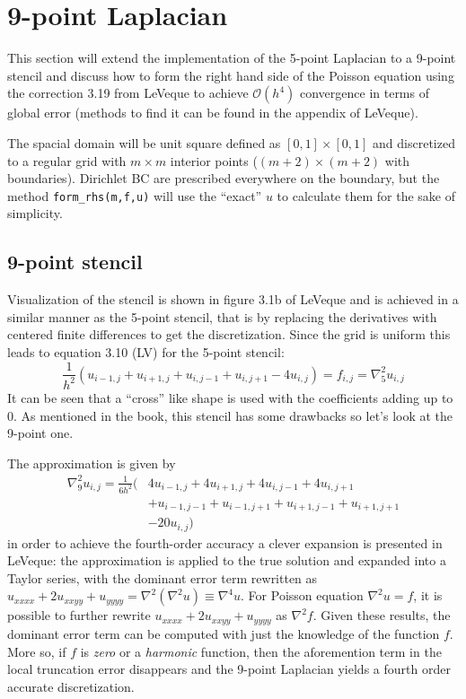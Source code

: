\documentclass[main.tex]{subfiles}
\begin{document}
\section{9-point Laplacian}
This section will extend the implementation of the 5-point Laplacian to a 9-point stencil and discuss how to form the right hand side of the Poisson equation using the correction 3.19 from LeVeque to achieve $\mathcal{O}(h^4)$ convergence in terms of global error (methods to find it can be found in the appendix of LeVeque).

The spacial domain will be unit square defined as $[0,1] \times [0,1]$ and discretized to a regular grid with $m \times m$ interior points ($(m+2) \times (m+2)$ with boundaries). Dirichlet BC are prescribed everywhere on the boundary, but the method \texttt{form\_rhs(m,f,u)} will use the ``exact'' $u$ to calculate them for the sake of simplicity.

\subsection{9-point stencil}
Visualization of the stencil is shown in figure 3.1b of LeVeque and is achieved in a similar manner as the 5-point stencil, that is by replacing the derivatives with centered finite differences to get the discretization. Since the grid is uniform this leads to equation 3.10 (LV) for the 5-point stencil:
\begin{equation}
    \frac{1}{h^2}(u_{i-1,j} + u_{i+1,j} + u_{i,j-1} + u_{i,j+1} - 4u_{i,j}) = f_{i,j} = \nabla_5^2 u_{i,j}
\end{equation}
It can be seen that a ``cross'' like shape is used with the coefficients adding up to 0. As mentioned in the book, this stencil has some drawbacks so let's look at the 9-point one.

The approximation is given by
\begin{equation}
\begin{split}
    \nabla_9^2 u_{i,j} = \frac{1}{6h^2}(&4u_{i-1,j} + 4u_{i+1,j} + 4u_{i,j-1} + 4u_{i,j+1} \\
        &+ u_{i-1,j-1} + u_{i-1,j+1} + u_{i+1,j-1} + u_{i+1,j+1}\\
        &- 20u_{i,j}
    )
\end{split}
\end{equation}
in order to achieve the fourth-order accuracy a clever expansion is presented in LeVeque: the approximation is applied to the true solution and expanded into a Taylor series, with the dominant error term rewritten as $u_{xxxx} + 2u_{xxyy} + u_{yyyy} = \nabla^2 (\nabla^2 u) \equiv \nabla^4 u$. For Poisson equation $\nabla^2 u = f$, it is possible to further rewrite $u_{xxxx} + 2u_{xxyy} + u_{yyyy}$ as $\nabla^2 f$. Given these results, the dominant error term can be computed with just the knowledge of the function $f$. More so, if $f$ is \textit{zero} or a \textit{harmonic} function, then the aforemention term in the local truncation error disappears and the 9-point Laplacian yields a fourth order accurate discretization.
\end{document}
